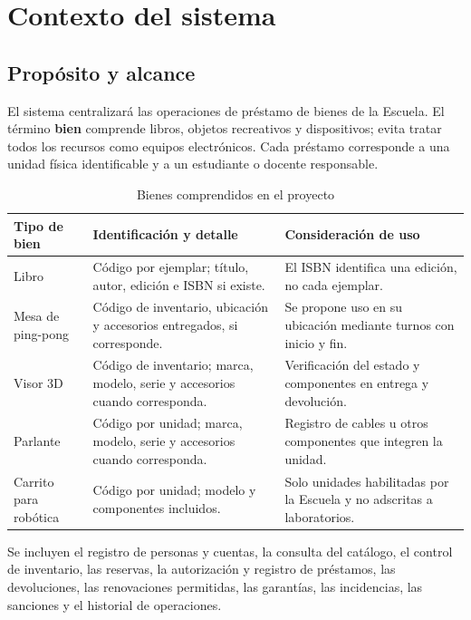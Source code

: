 \chapter{Contexto del sistema}
\label{cap:contexto}

\section{Prop\'osito y alcance}

El sistema centralizar\'a las operaciones de pr\'estamo de bienes de la Escuela. El t\'ermino \textbf{bien} comprende libros, objetos recreativos y dispositivos; evita tratar todos los recursos como equipos electr\'onicos. Cada pr\'estamo corresponde a una unidad f\'isica identificable y a un estudiante o docente responsable.

\begin{table}[htbp]
\centering
\small
\begin{tabularx}{\textwidth}{@{}>{\raggedright\arraybackslash}p{3cm}YY@{}}
\toprule
\textbf{Tipo de bien} & \textbf{Identificaci\'on y detalle} & \textbf{Consideraci\'on de uso} \\
\midrule
Libro & C\'odigo por ejemplar; t\'itulo, autor, edici\'on e ISBN si existe. & El ISBN identifica una edici\'on, no cada ejemplar. \\
Mesa de ping-pong & C\'odigo de inventario, ubicaci\'on y accesorios entregados, si corresponde. & Se propone uso en su ubicaci\'on mediante turnos con inicio y fin. \\
Visor 3D & C\'odigo de inventario; marca, modelo, serie y accesorios cuando corresponda. & Verificaci\'on del estado y componentes en entrega y devoluci\'on. \\
Parlante & C\'odigo por unidad; marca, modelo, serie y accesorios cuando corresponda. & Registro de cables u otros componentes que integren la unidad. \\
Carrito para rob\'otica & C\'odigo por unidad; modelo y componentes incluidos. & Solo unidades habilitadas por la Escuela y no adscritas a laboratorios. \\
\bottomrule
\end{tabularx}
\caption{Bienes comprendidos en el proyecto}
\end{table}

Se incluyen el registro de personas y cuentas, la consulta del cat\'alogo, el control de inventario, las reservas, la autorizaci\'on y registro de pr\'estamos, las devoluciones, las renovaciones permitidas, las garant\'ias, las incidencias, las sanciones y el historial de operaciones.


